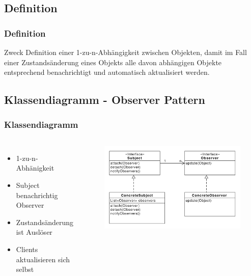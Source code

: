 \subsection{Definition}
\begin{frame}
  \frametitle{Definition}

  \begin{block}{Zweck}
  	Definition einer 1-zu-n-Abhängigkeit zwischen Objekten, damit im Fall einer Zustandsänderung eines Objekts alle davon abhängigen Objekte entsprechend benachrichtigt und automatisch aktualisiert werden.
  \end{block}
  
\end{frame}

\subsection{Klassendiagramm - Observer Pattern}

\begin{frame}
\frametitle{Klassendiagramm}
\begin{columns} 
    		\begin{itemize}
    			\item 1-zu-n-Abhänigkeit
    			\item Subject benachrichtig Observer
    			\item Zustandsänderung ist Auslöser
    			\item Clients aktualisieren sich selbst
    		\end{itemize}
    			\begin{figure}
					\includegraphics[scale=.37]{paper/observer/observer}
				\end{figure}
  	\end{columns} 
\end{frame}

